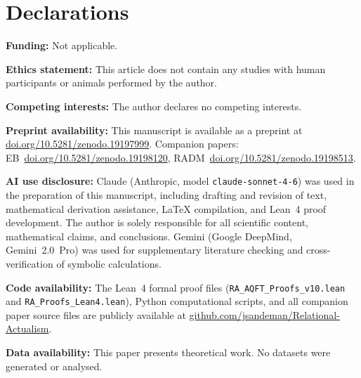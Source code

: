 \documentclass[11pt,a4paper]{article}
\theoremstyle{plain}
\theoremstyle{definition}
\theoremstyle{remark}
\begin{document}
\section*{Declarations}
\textbf{Funding:} Not applicable.

\textbf{Ethics statement:} This article does not contain any studies with human participants or animals performed by the author.

\quad
\textbf{Competing interests:} The author declares no competing interests.

\textbf{Preprint availability:} This manuscript is available as a preprint at
\href{https://doi.org/10.5281/zenodo.19197999}{doi.org/10.5281/zenodo.19197999}.
Companion papers: EB~\href{https://doi.org/10.5281/zenodo.19198120}{doi.org/10.5281/zenodo.19198120}, RADM~\href{https://doi.org/10.5281/zenodo.19198513}{doi.org/10.5281/zenodo.19198513}.

\textbf{AI use disclosure:} Claude (Anthropic, model \texttt{claude-sonnet-4-6}) was used in the preparation of this manuscript, including drafting and revision of text, mathematical derivation assistance, \LaTeX{} compilation, and Lean~4 proof development. The author is solely responsible for all scientific content, mathematical claims, and conclusions. Gemini (Google DeepMind, Gemini~2.0~Pro) was used for supplementary literature checking and cross-verification of symbolic calculations.


\textbf{Code availability:} The Lean~4 formal proof files (\texttt{RA\_AQFT\_Proofs\_v10.lean} and \texttt{RA\_Proofs\_Lean4.lean}), Python computational scripts, and all companion paper source files are publicly available at \href{https://github.com/jsandeman/Relational-Actualism}{github.com/jsandeman/Relational-Actualism}.

\textbf{Data availability:} This paper presents theoretical work. No datasets
were generated or analysed.
\end{document}

